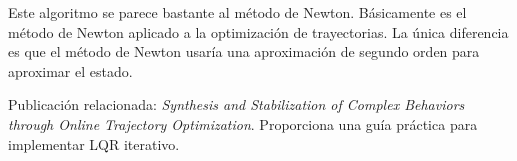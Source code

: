 Este algoritmo se parece bastante al método de Newton. Básicamente es el método de Newton
aplicado a la optimización de trayectorias. La única diferencia es que el método de Newton
usaría una aproximación de segundo orden para aproximar el estado.

Publicación relacionada: \textit{Synthesis and Stabilization of Complex Behaviors through
Online Trajectory Optimization}. Proporciona una guía práctica para implementar LQR
iterativo.
